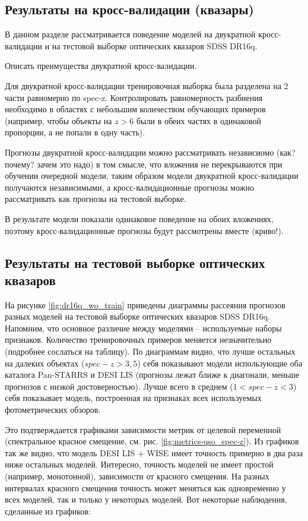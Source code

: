 \documentclass[fleqn,usenatbib]{mnras}
\begin{document}
\subsection{Результаты на кросс-валидации (квазары)}
В данном разделе рассматривается поведение моделей на двукратной кросс-валидации и на тестовой выборке оптических квазаров SDSS DR16q.

Описать преимущества двукратной кросс-валидации.

Для двукратной кросс-валидации тренировочная выборка была разделена на 2 части равномерно по spec-z. Контролировать равномерность разбиения необходимо в областях с небольшим количеством обучающих примеров (например, чтобы объекты на $z > 6$ были в обеих частях в одинаковой пропорции, а не попали в одну часть).

Прогнозы двукратной кросс-валидации можно рассматривать независиомо (как? почему? зачем это надо) в том смысле, что вложения не перекрываются при обучении очередной модели, таким образом модели двукратной кросс-валидации получаются независимыми, а кросс-валидационные прогнозы можно рассматривать как прогнозы на тестовой выборке.

В результате модели показали одинаковое поведение на обоих вложениях, поэтому кросс-валидационные прогнозы будут рассмотрены вместе (криво!).

\subsection{Результаты на тестовой выборке оптических квазаров}

На рисунке \ref{fig:dr16q_wo_train} приведены диаграммы рассеяния прогнозов разных моделей на тестовой выборке оптических квазаров SDSS DR16q. Напомним, что основное различие между моделями -- используемые наборы признаков. Количество тренировочных примеров меняется незначительно (подробнее сослаться на таблицу). По диаграммам видно, что  лучше остальных на далеких объектах ($spec-z > 3,5$) себя показывают модели использующие оба каталога Pan-STARRS и DESI LIS (прогнозы лежат ближе к диагонали, меньше прогнозов с низкой достоверностью). Лучше всего в среднем ($1 < spec-z < 3$) себя показывает модель, построенная на признаках всех используемых фотометрических обзоров.

Это подтверждается графиками зависимости метрик от целевой переменной (спектральное красное смещение, см. рис. \ref{fig:metrics-qso_spec-z}). Из графиков так же видно, что модель DESI LIS + WISE имеет точность примерно в два раза ниже остальных моделей. Интересно, точность моделей не имеет простой (например, монотонной), зависимости от красного смещения. На разных интервалах красного смещения точность может меняться как одновременно у всех моделей, так и только у некоторых моделей. Вот некоторые наблюдения, сделанные из графиков:
\end{document}
